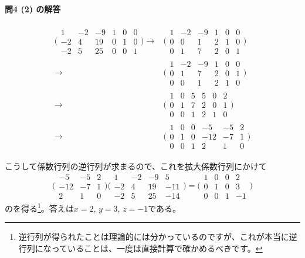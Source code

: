 \paragraph{問4 (2) の解答}
\begin{align*}
\Biggl(
\begin{array}{rrr|rrr}
1 & -2 & -9 & 1 & 0 & 0 \\
-2 & 4 & 19 & 0 & 1 & 0 \\
-2 & 5 & 25 & 0 & 0 & 1
\end{array}
\Biggr)
\xrightarrow[]{}
& \Biggl(
\begin{array}{rrr|rrr}
1 & -2 & -9 & 1 & 0 & 0 \\
0 & 0 & 1 & 2 & 1 & 0 \\
0 & 1 & 7 & 2 & 0 & 1
\end{array}
\Biggr)
\\
\xrightarrow[]{}
& \Biggl(
\begin{array}{rrr|rrr}
1 & -2 & -9 & 1 & 0 & 0 \\
0 & 1 & 7 & 2 & 0 & 1 \\
0 & 0 & 1 & 2 & 1 & 0
\end{array}
\Biggr)
\\
\xrightarrow[]{}
& \Biggl(
\begin{array}{rrr|rrr}
1 & 0 & 5 & 5 & 0 & 2 \\
0 & 1 & 7 & 2 & 0 & 1 \\
0 & 0 & 1 & 2 & 1 & 0
\end{array}
\Biggr)
\\
\xrightarrow[]{}
& \Biggl(
\begin{array}{rrr|rrr}
1 & 0 & 0 & -5 & -5 & 2 \\
0 & 1 & 0 & -12 & -7 & 1 \\
0 & 0 & 1 & 2 & 1 & 0
\end{array}
\Biggr)
\end{align*}

こうして係数行列の逆行列が求まるので、これを拡大係数行列にかけて
\[
\Biggl(
\begin{array}{rrr}
-5 & -5 & 2 \\
-12 & -7 & 1\\
2 & 1 & 0
\end{array}
\Biggr)
\Biggl(
\begin{array}{rrrr}
1 & -2 & -9 & 5 \\
-2 & 4 & 19 & -11 \\
-2 & 5 & 25 & -14 
\end{array}
\Biggr)
=
\Biggl(
\begin{array}{rrrr}
1 & 0 & 0 & 2 \\
0 & 1 & 0 & 3 \\
0 & 0 & 1 & -1
\end{array}
\Biggr)
\]
のを得る\footnote{逆行列が得られたことは理論的には分かっているのですが、これが本当に逆行列になっていることは、一度は直接計算で確かめるべきです。}。答えは$x = 2$, $y = 3$, $z = -1$である。


